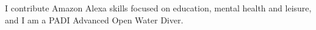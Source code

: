 

\begin{cvparagraph}

I contribute Amazon Alexa skills focused on education, mental health and leisure, and I am a PADI Advanced Open Water Diver.
\end{cvparagraph}
